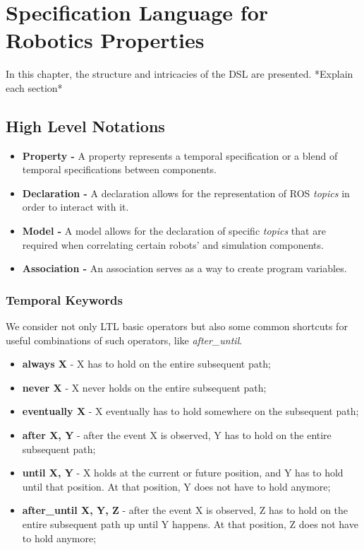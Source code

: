 \chapter{Specification Language for Robotics Properties}
\label{chap:language}

In this chapter, the structure and intricacies of the DSL are presented. *Explain each section*

\section{High Level Notations}

\begin{itemize}
\item \textbf{Property -} A property represents a temporal specification or a blend of temporal specifications between components.
\item \textbf{Declaration -} A declaration allows for the representation of ROS \textit{topics} in order to interact with it.
\item \textbf{Model -} A model allows for the declaration of specific \textit{topics} that are required when correlating certain robots' and simulation components.
\item \textbf{Association -} An association serves as a way to create program variables.
\end{itemize}

\subsection{Temporal Keywords}

We consider not only LTL basic operators but also some common shortcuts for useful combinations of such operators, like \textit{after\_until}.

\begin{itemize}
\item {\bfseries always X} - X has to hold on the entire subsequent path;
\item {\bfseries never X} - X never holds on the entire subsequent path;
\item {\bfseries eventually X} - X eventually has to hold somewhere on the subsequent path;
\item {\bfseries after X, Y} - after the event X is observed, Y has to hold on the entire subsequent path;
\item {\bfseries until X, Y} - X holds at the current or future position, and Y has to hold until that position. At that position, Y does not have to hold anymore;
\item {\bfseries after\_until X, Y, Z} - after the event X is observed, Z has to hold on the entire subsequent path up until Y happens. At that position, Z does not have to hold anymore;
\end{itemize}

